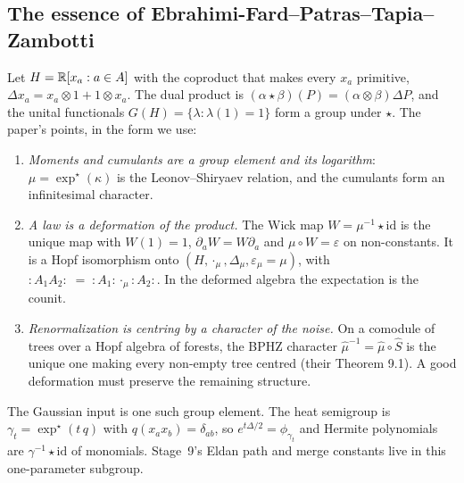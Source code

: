 \label{sec:hopf}
\subsection{The essence of Ebrahimi-Fard--Patras--Tapia--Zambotti}
Let $H=\mathbb R[x_a:a\in A]$ with the coproduct that makes every $x_a$ primitive, $\Delta x_a=x_a\otimes1+1\otimes x_a$. The dual product is
$(\alpha\star\beta)(P)=(\alpha\otimes\beta)\Delta P$, and the unital functionals $G(H)=\{\lambda:\lambda(1)=1\}$ form a group under $\star$. The paper's
points, in the form we use:
\begin{enumerate}[leftmargin=*]
\item \emph{Moments and cumulants are a group element and its logarithm}: $\mu=\exp^\star(\kappa)$ is the Leonov--Shiryaev relation, and the
cumulants form an infinitesimal character.
\item \emph{A law is a deformation of the product.} The Wick map $W=\mu^{-1}\star\mathrm{id}$ is the unique map with $W(1)=1$, $\partial_a W=W\partial_a$
and $\mu\circ W=\varepsilon$ on non-constants. It is a Hopf isomorphism onto $(H,\cdot_\mu,\Delta_\mu,\varepsilon_\mu=\mu)$, with
$:\!A_1A_2\!:\;=\;:\!A_1\!:\cdot_\mu:\!A_2\!:$. In the deformed algebra the expectation is the counit.
\item \emph{Renormalization is centring by a character of the noise.} On a comodule of trees over a Hopf algebra of forests, the BPHZ
character $\hat\mu^{-1}=\hat\mu\circ\hat S$ is the unique one making every non-empty tree centred (their Theorem 9.1). A good deformation
must preserve the remaining structure.
\end{enumerate}
The Gaussian input is one such group element. The heat semigroup is $\gamma_t=\exp^\star(t\,q)$ with $q(x_ax_b)=\delta_{ab}$, so
$e^{t\Delta/2}=\phi_{\gamma_t}$ and Hermite polynomials are $\gamma^{-1}\star\mathrm{id}$ of monomials. Stage~9's Eldan path and merge constants
live in this one-parameter subgroup.

